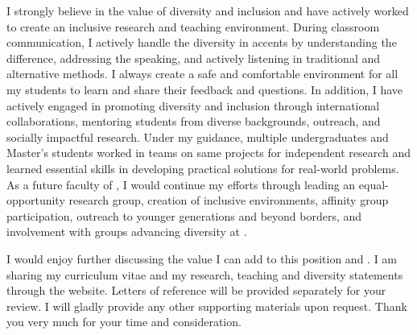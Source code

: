 \documentclass[11pt]{article}
\renewcommand*\paragraph[1]{}
\begin{document}
\paragraph{Diversity}
I strongly believe in the value of diversity and inclusion and have actively worked to create an inclusive research and teaching environment. During classroom communication, I actively handle the diversity in accents by understanding the difference, addressing the speaking, and actively listening in traditional and alternative methods.
I always create a safe and comfortable environment for all my students to learn and share their feedback and questions. In addition, I have actively engaged in promoting diversity and inclusion through international collaborations, mentoring students from diverse backgrounds, outreach, and socially impactful research. Under my guidance, multiple undergraduates and Master's students worked in teams on same projects for independent research and learned essential skills in developing practical solutions for real-world problems. As a future faculty of \shortInstitutionName{}, I would continue my efforts through leading an equal-opportunity research group, creation of inclusive environments, affinity group participation, outreach to younger generations and beyond borders, and involvement with groups advancing diversity at \shortInstitutionName{}. 

\paragraph{P3) Relevant industrial experience beneficial to CS/ DS curriculum development and CS/DS capstone project advising}




I would enjoy further discussing the value I can add to this position and \InstitutionName{}. I am sharing my curriculum vitae and my research, teaching and diversity 
statements
through the website. Letters of reference will be provided separately for your review. I will gladly provide any other supporting materials upon request. Thank you very much for your time and consideration.
\end{document}

